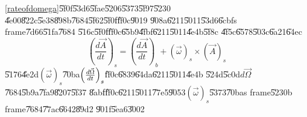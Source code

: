 \documentclass[12pt,a4paper]{article}
\begin{document}
\ref{rateofdomega}\U{5f0f}\U{53d6}\U{5fae}\U{5206}\U{5373}\U{5f97}\U{5230}%
\U{4e00}\U{822c}\U{5e38}\U{898b}\U{7684}\U{5f62}\U{5f0f}\U{ff0c}\U{9019}%
\U{908a}\U{6211}\U{5011}\U{53d6}\U{6cbf}s frame\U{7d66}\U{51fa}\U{7684}%
\U{516c}\U{5f0f}\U{ff0c}\U{65b9}\U{4fbf}\U{6211}\U{5011}\U{4e4b}\U{5f8c}%
\U{4f5c}\U{6578}\U{503c}\U{6a21}\U{64ec}%
\begin{equation}
\left( \frac{d\vec{A}}{dt}\right) _{s}=\left( \frac{d\vec{A}}{dt}\right)
_{b}+\left( \vec{\omega}\right) _{s}\times \left( \vec{A}\right) _{s}
\label{rateofchange}
\end{equation}%
\U{5176}\U{4e2d}$\left( \vec{\omega}\right) _{s}$\U{70ba}$\left( \frac{d\vec{%
\Omega}}{dt}\right) _{s}$\U{ff0c}\U{6839}\U{64da}\U{6211}\U{5011}\U{4e4b}%
\U{524d}\U{5c0d}$d\vec{\Omega}$\U{7684}\U{5b9a}\U{7fa9}\U{8207}\U{5f37}%
\U{8abf}\U{ff0c}\U{6211}\U{5011}\U{77e5}\U{9053}$\left( \vec{\omega}\right)
_{s}$\U{5373}\U{70ba}s frame\U{5230}b frame\U{7684}\U{77ac}\U{6642}\U{89d2}%
\U{901f}\U{5ea6}\U{3002}
\end{document}
